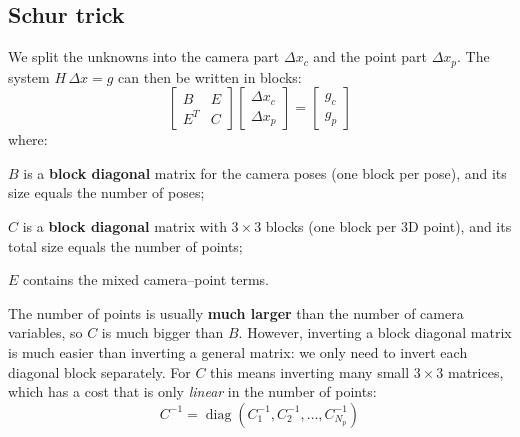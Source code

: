 \subsection{Schur trick}
We split the unknowns into the camera part $\Delta x_c$ and the point part $\Delta x_p$. The system $H\,\Delta x = g$ can then be written in blocks:
\[
\begin{bmatrix} B & E \\ E^T & C \end{bmatrix}
\begin{bmatrix} \Delta x_c \\ \Delta x_p \end{bmatrix}
=
\begin{bmatrix} g_c \\ g_p \end{bmatrix}
\]
where:
\begin{compactitemize}
    \item $B$ is a \textbf{block diagonal} matrix for the camera poses (one block per pose), and its size equals the number of poses;
    \item $C$ is a \textbf{block diagonal} matrix with $3\times 3$ blocks (one block per 3D point), and its total size equals the number of points;
    \item $E$ contains the mixed camera--point terms.
\end{compactitemize}

The number of points is usually \textbf{much larger} than the number of camera variables, so $C$ is much bigger than $B$. However, inverting a block diagonal matrix is much easier than inverting a general matrix: we only need to invert each diagonal block separately. For $C$ this means inverting many small $3\times 3$ matrices, which has a cost that is only \emph{linear} in the number of points:
\[
C^{-1} = \operatorname{diag}\!\left(C_1^{-1}, C_2^{-1}, \dots, C_{N_p}^{-1}\right)
\]

